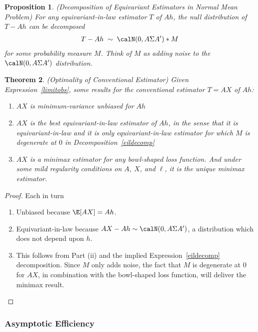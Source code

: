 \documentclass[12pt]{article}
\theoremstyle{plain}
\newtheorem{thm}{Theorem}[section]
\newtheorem{prop}[thm]{Proposition}
\theoremstyle{definition}
\theoremstyle{remark}
\begin{document}
\begin{prop}
\label{decompequivariant}
\emph{(Decomposition of Equivariant Estimators in Normal Mean Problem)}
For any equivariant-in-law estimator $T$ of $Ah$, the null distribution
of $T-Ah$ can be decomposed
\begin{align}
  T-Ah
  \;
  \sim
  \;
  \calN(0,A\Sigma A') * M
  \label{eildecomp}
\end{align}
for some probability measure $M$.
Think of $M$ as adding noise to the $\calN(0,A\Sigma A')$ distribution.
\end{prop}

\begin{thm}
\label{normalopt}
\emph{(Optimality of Conventional Estimator)}
Given Expression~\ref{limitobs},
some results for the conventional estimator $T=AX$ of $Ah$:
\begin{enumerate}[label=(\roman*)]
  \item $AX$ is minimum-variance unbiased for $Ah$
  \item $AX$ is the best equivariant-in-law estimator of $Ah$,
    in the sense that it is equivariant-in-law and it is \emph{only}
    equivariant-in-law estimator for which $M$ is degenerate at $0$ in
    Decomposition~\ref{eildecomp}
  \item $AX$ is a minimax estimator for any bowl-shaped loss function.
    And under some mild regularity conditions on $A$, $X$, and $\ell$,
    it is the \emph{unique} minimax estimator.
\end{enumerate}
\end{thm}
\begin{proof}
Each in turn
\begin{enumerate}[label=(\roman*)]
  \item Unbiased because $\E[AX]=Ah$.
  \item Equivariant-in-law because
    $AX-Ah\sim\calN(0,A\Sigma A')$, a distribution which does not depend
    upon $h$.
  \item This follows from Part (ii) and the implied
    Expression~\ref{eildecomp} decomposition.
    Since $M$ only adds noise, the fact that $M$ is degenerate at 0 for
    $AX$, in combination with the bowl-shaped loss function, will
    deliver the minimax result.
\end{enumerate}
\end{proof}



\clearpage
\subsubsection{Asymptotic Efficiency}
\end{document}
